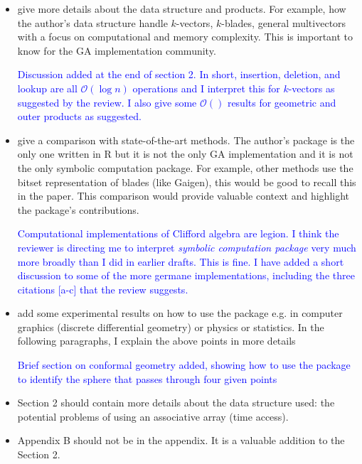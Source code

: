 \documentclass{article}
\begin{document}
\begin{itemize}
\item give more details about the data structure and products.  For
  example, how the author's data structure handle $k$-vectors,
  $k$-blades, general multivectors with a focus on computational and
  memory complexity.  This is important to know for the GA
  implementation community.

\textcolor{blue}{Discussion added at the end of section 2.  In short,
  insertion, deletion, and lookup are all $\mathcal{O}(\log n)$
  operations and I interpret this for $k$-vectors as suggested by the
  review.  I also give some $\mathcal{O}()$ results for geometric and
  outer products as suggested.}

\item give a comparison with state-of-the-art methods.  The author's
  package is the only one written in R but it is not the only GA
  implementation and it is not the only symbolic computation
  package.  For example, other methods use the bitset representation of
  blades (like Gaigen), this would be good to recall this in the
  paper.  This comparison would provide valuable context and highlight
  the package's contributions.

\textcolor{blue}{Computational implementations of Clifford algebra are
  legion.  I think the reviewer is directing me to interpret {\em symbolic
  computation package} very much more broadly than I did in earlier
  drafts.  This is fine.  I have added a short discussion to some of
  the more germane implementations, including the three citations
  [a-c] that the review suggests.}
  
\item add some experimental results on how to use the package e.g. in
  computer graphics (discrete differential geometry) or physics or
  statistics.  In the following paragraphs, I explain the above points
  in more details

\textcolor{blue}{Brief section on conformal geometry added, showing
  how to use the package to identify the sphere that passes through
  four given points}

\item Section 2 should contain more details about the data structure
  used: the potential problems of using an associative array (time
  access).

\item Appendix B should not be in the appendix.  It is a valuable
  addition to the Section 2.


\end{itemize}
\end{document}
